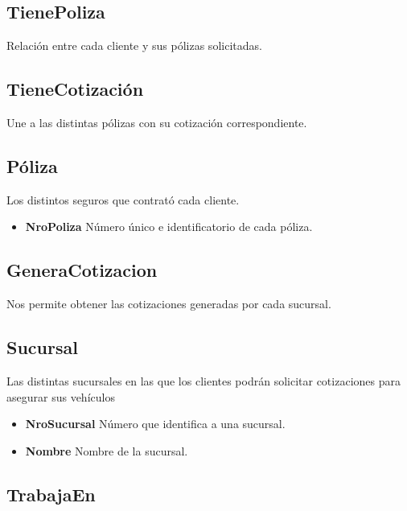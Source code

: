 \documentclass[a4paper,11pt]{article}
\begin{document}
\subsection{TienePoliza}

Relación entre cada cliente y sus pólizas solicitadas.

\subsection{TieneCotización}

Une a las distintas pólizas con su cotización correspondiente.

\subsection{Póliza}

Los distintos seguros que contrató cada cliente.

\begin{itemize}
   
  \item \textbf{NroPoliza} Número único e identificatorio de cada póliza.
      
\end{itemize}

\subsection{GeneraCotizacion}

Nos permite obtener las cotizaciones generadas por cada sucursal.

\subsection{Sucursal}

Las distintas sucursales en las que los clientes podrán solicitar cotizaciones para asegurar sus vehículos

\begin{itemize}
   
  \item \textbf{NroSucursal} Número que identifica a una sucursal.
  
  \item \textbf{Nombre} Nombre de la sucursal.
  
\end{itemize}

\subsection{TrabajaEn}
\end{document}
